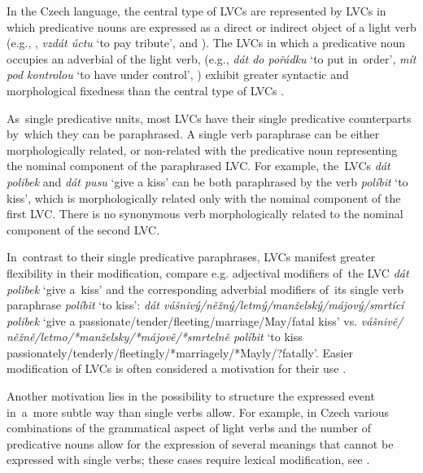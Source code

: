 \documentclass[output=paper
,modfonts
,nonflat]{langsci/langscibook}
\begin{document}
In the Czech language, the central type of LVCs are represented by LVCs in 
which predicative nouns are expressed as a direct or indirect object of a 
light verb (e.g., , 
\textit{vzdát úctu} `to pay tribute', and ). 
The LVCs in which a predicative noun occupies an adverbial of the light verb, 
(e.g., \textit{dát do pořádku} `to put in~order', \textit{mít pod kontrolou} 
`to have under control', ) exhibit greater syntactic and morphological fixedness than the 
central type of LVCs \citep{radimsky-10}.

As~single predicative units, most LVCs have their single predicative 
counterparts by~which they can be paraphrased. A single verb paraphrase can be
either morphologically related, or non-related with the predicative noun 
representing the nominal component of the paraphrased LVC. For example, the~LVCs 
\textit{dát polibek} and \textit{dát pusu} `give a kiss' can be both paraphrased 
by the verb \textit{políbit} `to kiss', which is morphologically related only 
with the nominal component of  the first LVC. There is no synonymous verb 
morphologically related to the nominal component of the second LVC.

In~contrast to their single predicative paraphrases, LVCs manifest greater 
flexibility in their modification, compare e.g. adjectival modifiers of~the LVC 
\textit{dát polibek} `give a~kiss' and the corresponding adverbial modifiers 
of~its single verb paraphrase \textit{políbit} `to kiss':  
\textit{dát váš\-ni\-vý/něž\-ný/let\-mý/man\-žel\-ský/má\-jo\-vý/smr\-tí\-cí 
po\-li\-bek} `give a pas\-sion\-ate/ten\-der/fleet\-ing/mar\-riage/May/fa\-tal 
kiss' vs. \textit{váš\-ni\-vě/ něž\-ně/let\-mo/*man\-žel\-sky/*má\-jo\-vě/*smr\-tel\-ně 
po\-lí\-bit} `to kiss pas\-sion\-ate\-ly/ten\-der\-ly/fleet\-ing\-ly/*mar\-riage\-ly/*May\-ly/?fa\-tal\-ly'.  Easier modification of LVCs is often considered a motivation for their use \citep{brinton-99}.

Another motivation lies in the possibility to structure the expressed event 
in~a~more subtle way than single verbs allow. For example, in Czech various 
combinations of the grammatical aspect of light verbs and the number of 
predicative nouns allow for the expression of several meanings that cannot be 
expressed with single verbs; these cases require lexical modification, see 
.
\end{document}
